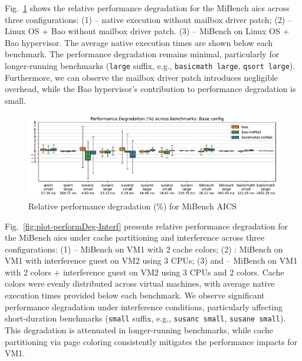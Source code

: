 Fig.~\ref{fig:plot-performDeg-Base} shows the relative performance degradation
for the MiBench \gls{aics} across three configurations:
(1)  -- native
execution without mailbox driver patch;
(2)
 -- Linux OS + Bao without
mailbox driver patch.
(3)
 -- MiBench on Linux OS + Bao
hypervisor. The average native execution times are shown below each benchmark.
%
The performance degradation remains minimal, particularly for longer-running
benchmarks (\lstinline{large} suffix, e.g., \lstinline{basicmath large},
\lstinline{qsort large}). Furthermore, we can observe the mailbox driver patch
introduces negligible overhead, while the Bao hypervisor's contribution to performance degradation is small.

\begin{figure}[!hbt]
  \centering
  \includegraphics[width=1.0\textwidth]{./img/pdf/plot-performDeg-Base} 
  \caption{Relative performance degradation (\%) for MiBench AICS}%
  \label{fig:plot-performDeg-Base}
\end{figure}


Fig.~\ref{fig:plot-performDeg-Interf} presents relative performance degradation
for the MiBench \gls{aics} under cache partitioning and interference across
three configurations: (1)  --
MiBench on VM1 with 2 cache colors; (2)
: MiBench on VM1 with
interference guest on VM2 using 3 CPUs; (3) and
 -- MiBench on VM1 with 2
colors + interference guest on VM2 using 3 CPUs and 2 colors. Cache colors were
evenly distributed across virtual machines, with average native execution times
provided below each benchmark.
%
We observe significant performance degradation under interference
conditions, particularly affecting short-duration benchmarks (\lstinline{small}
suffix, e.g., \lstinline{susanc small}, \lstinline{susane small}). This
degradation is attenuated in longer-running benchmarks, while cache partitioning
via page coloring consistently mitigates the performance impacts for VM1.

